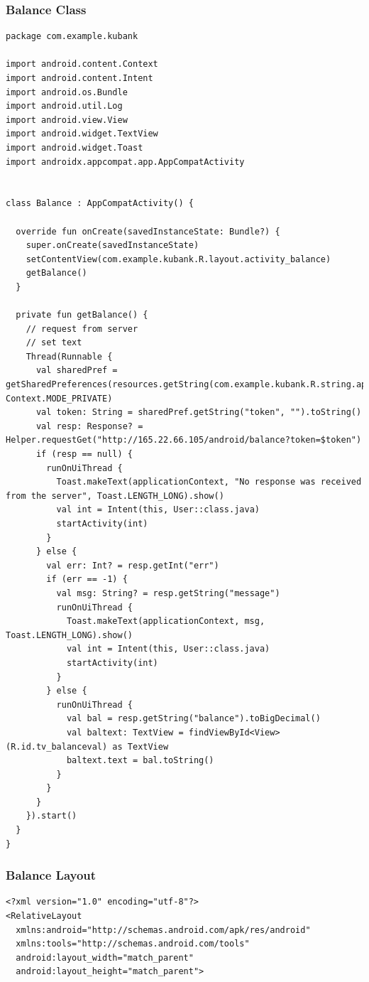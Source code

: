 \documentclass[11pt, a4paper]{article}
\begin{document}
\begin{appendices}
\subsubsection{Balance Class}
\begin{lstlisting}
package com.example.kubank

import android.content.Context
import android.content.Intent
import android.os.Bundle
import android.util.Log
import android.view.View
import android.widget.TextView
import android.widget.Toast
import androidx.appcompat.app.AppCompatActivity


class Balance : AppCompatActivity() {

  override fun onCreate(savedInstanceState: Bundle?) {
    super.onCreate(savedInstanceState)
    setContentView(com.example.kubank.R.layout.activity_balance)
    getBalance()
  }

  private fun getBalance() {
    // request from server
    // set text
    Thread(Runnable {
      val sharedPref = getSharedPreferences(resources.getString(com.example.kubank.R.string.app_name), Context.MODE_PRIVATE)
      val token: String = sharedPref.getString("token", "").toString()
      val resp: Response? = Helper.requestGet("http://165.22.66.105/android/balance?token=$token")
      if (resp == null) {
        runOnUiThread {
          Toast.makeText(applicationContext, "No response was received from the server", Toast.LENGTH_LONG).show()
          val int = Intent(this, User::class.java)
          startActivity(int)
        }
      } else {
        val err: Int? = resp.getInt("err")
        if (err == -1) {
          val msg: String? = resp.getString("message")
          runOnUiThread {
            Toast.makeText(applicationContext, msg, Toast.LENGTH_LONG).show()
            val int = Intent(this, User::class.java)
            startActivity(int)
          }
        } else {
          runOnUiThread {
            val bal = resp.getString("balance").toBigDecimal()
            val baltext: TextView = findViewById<View>(R.id.tv_balanceval) as TextView
            baltext.text = bal.toString()
          }
        }
      }
    }).start()
  }
}
\end{lstlisting}
\subsubsection{Balance Layout}
\begin{lstlisting}
<?xml version="1.0" encoding="utf-8"?>
<RelativeLayout
  xmlns:android="http://schemas.android.com/apk/res/android"
  xmlns:tools="http://schemas.android.com/tools"
  android:layout_width="match_parent"
  android:layout_height="match_parent">



\end{lstlisting}
\end{appendices}
\end{document}
